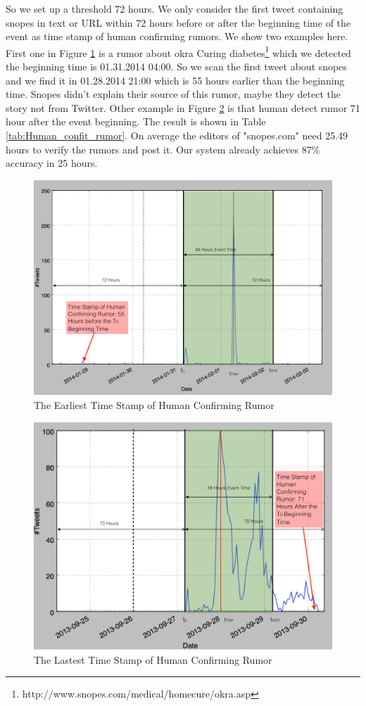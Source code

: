So we set up a threshold 72 hours. We only consider the first tweet containing snopes in text or URL within 72 hours before or after the beginning time of the event as time stamp of human confirming rumors. We show two examples here. First one in Figure \ref{fig:ealiset_rumo} is a rumor about okra Curing diabetes\footnote{http://www.snopes.com/medical/homecure/okra.asp} which we detected the beginning time is 01.31.2014 04:00. So we scan the first tweet about snopes and we find it in 01.28.2014 21:00 which is 55 hours earlier than the beginning time. Snopes didn't explain their source of this rumor, maybe they detect the story not from Twitter. 
Other example in Figure \ref{fig:lastest_rumo} is that  human detect rumor 71 hour after the event beginning.  
The result is shown in Table \ref{tab:Human_confit_rumor}. On average the editors of "snopes.com" need 25.49 hours to verify the rumors and post it. Our system already achieves 87\% accuracy in 25 hours. 
     \begin{figure}[!h]
\centering
\includegraphics[width=0.8\columnwidth]{images/Timestamphummanearlist.png}
\caption{The Earliest Time Stamp of Human Confirming Rumor}
\label{fig:ealiset_rumo}
\end{figure} 
  \begin{figure}[!h]
\centering
\includegraphics[width=0.8\columnwidth]{images/Timestamphummanlatest.png}
\caption{The Lastest Time Stamp of Human Confirming Rumor}
\label{fig:lastest_rumo}
\end{figure} 
